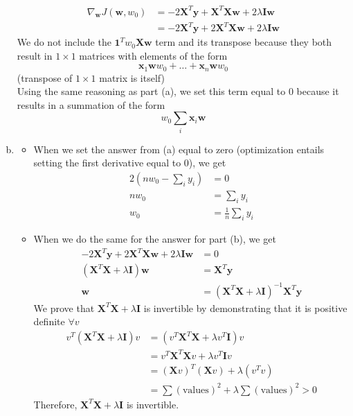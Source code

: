 \documentclass[submit]{harvardml}
\begin{document}
\begin{enumerate}[(a)]
\begin{align*}
			\nabla_\textbf{w} J(\textbf{w},w_0) &=-2\textbf{X}^T\textbf{y} + \textbf{X}^T\textbf{X}\textbf{w} + 2\lambda\textbf{I}\textbf{w} \\ 
			&= \boxed{-2\textbf{X}^T\textbf{y} +2 \textbf{X}^T\textbf{X}\textbf{w} +2 \lambda\textbf{I}\textbf{w}}
		\end{align*}
	We do not include the $ \textbf{1}^Tw_0\textbf{X}\textbf{w}$ term and its transpose because they both 
	result in $1 \times 1$ matrices with elements of the form 
		$$\textbf{x}_1\textbf{w}w_0 + \dots +\textbf{x}_n\textbf{w}w_0$$ 
	(transpose of $1 \times 1$ matrix is itself) \\
	Using the same reasoning as part (a), we set this term equal to 0 because it results in a summation of the form
		$$w_0 \sum_i \textbf{x}_i\textbf{w}$$ 		
	\item  
		\begin{itemize}
			\item When we set the answer from (a) equal to zero (optimization entails setting the first 
				derivative equal to 0), we get
					\begin{align*}
						2\left(nw_0-\sum_i y_i  \right) &= 0 \\
						nw_0 &= \sum_i y_i \\
						w_0 &= \frac{1}{n} \sum_i y_i
					\end{align*}
			\item When we do the same for the answer for part (b), we get
					\begin{align*}
						-2\textbf{X}^T\textbf{y} +2 \textbf{X}^T\textbf{X}\textbf{w} +2 \lambda\textbf{I}\textbf{w} &= 0\\
						(\textbf{X}^T\textbf{X} + \lambda\textbf{I})\textbf{w} &= \textbf{X}^T\textbf{y} \\ 
						\textbf{w} &= (\textbf{X}^T\textbf{X} + \lambda\textbf{I})^{-1} \textbf{X}^T\textbf{y}
					\end{align*}
				We prove that $\textbf{X}^T\textbf{X} + \lambda\textbf{I}$ is invertible by demonstrating that 
				it is positive definite $\forall v$
					\begin{align*}
						v^T(\textbf{X}^T\textbf{X} + \lambda\textbf{I})v &= (v^T\textbf{X}^T\textbf{X} + \lambda v^T\textbf{I})v  \\
						&= v^T\textbf{X}^T\textbf{X}v + \lambda v^T\textbf{I}v\\
						&= (\textbf{X}v)^T(\textbf{X}v) + \lambda(v^T v) \\
						&= \sum(\text{values})^2 + \lambda \sum(\text{values})^2 > 0
					\end{align*}
				Therefore, $\textbf{X}^T\textbf{X} + \lambda\textbf{I}$ is invertible. 	
		\end{itemize}
\end{enumerate}
\end{document}
